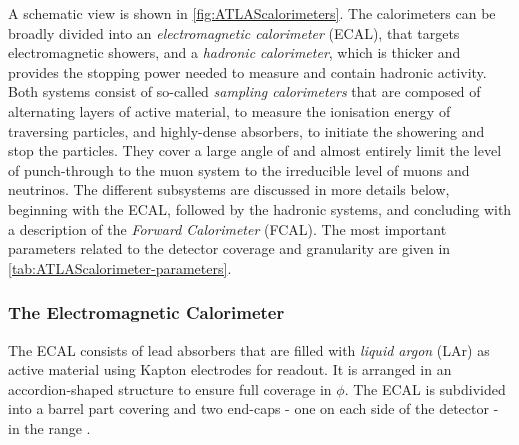 

A schematic view is shown in \cref{fig:ATLAScalorimeters}.
The calorimeters can be broadly divided into an \emph{electromagnetic calorimeter} (ECAL), that targets electromagnetic showers, and a \emph{hadronic calorimeter}, which is thicker and provides the stopping power needed to measure and contain hadronic activity. Both systems consist of so-called \emph{sampling calorimeters} that are composed of alternating layers of active material, to measure the ionisation energy of traversing particles, and highly-dense absorbers, to initiate the showering and stop the particles. 
They cover a large angle of  and almost entirely limit the level of punch-through to the muon system to the irreducible level of muons and neutrinos. The different subsystems are discussed in more details below, beginning with the ECAL, followed by the hadronic systems, and concluding with a description of the \emph{Forward Calorimeter} (FCAL). The most important parameters related to the detector coverage and granularity are given in \cref{tab:ATLAScalorimeter-parameters}.


\subsubsection{The Electromagnetic Calorimeter}
The ECAL consists of lead absorbers that are filled with \emph{liquid argon} (LAr) as active material using Kapton electrodes for readout.
It is arranged in an accordion-shaped structure to ensure full coverage in $\phi$.
The ECAL is subdivided into a barrel part covering  and two end-caps - one on each side of the detector - in the range .

